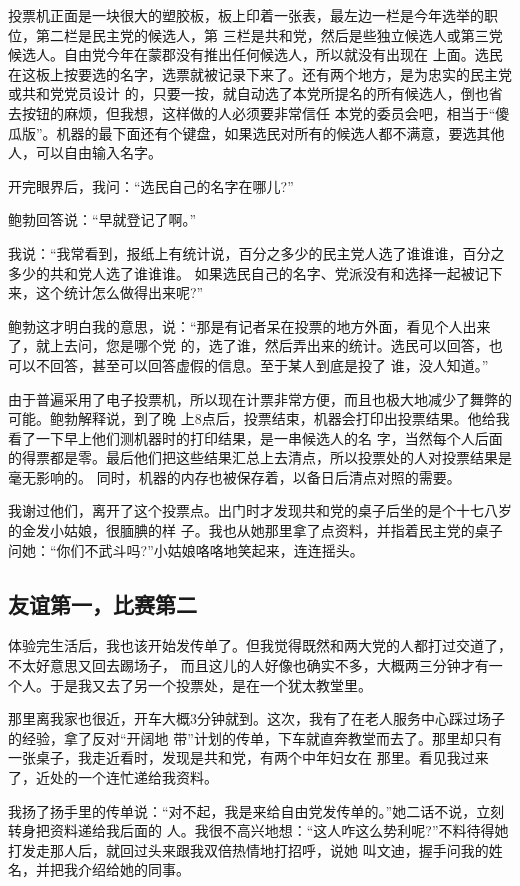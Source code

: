 ﻿\documentclass[11pt]{article}
\begin{document}
投票机正面是一块很大的塑胶板，板上印着一张表，最左边一栏是今年选举的职位，第二栏是民主党的候选人，第
三栏是共和党，然后是些独立候选人或第三党候选人。自由党今年在蒙郡没有推出任何候选人，所以就没有出现在
上面。选民在这板上按要选的名字，选票就被记录下来了。还有两个地方，是为忠实的民主党或共和党党员设计
的，只要一按，就自动选了本党所提名的所有候选人，倒也省去按钮的麻烦，但我想，这样做的人必须要非常信任
本党的委员会吧，相当于``傻瓜版''。机器的最下面还有个键盘，如果选民对所有的候选人都不满意，要选其他
人，可以自由输入名字。

开完眼界后，我问：``选民自己的名字在哪儿?''

鲍勃回答说：``早就登记了啊。''

我说：``我常看到，报纸上有统计说，百分之多少的民主党人选了谁谁谁，百分之多少的共和党人选了谁谁谁。
如果选民自己的名字、党派没有和选择一起被记下来，这个统计怎么做得出来呢?''

鲍勃这才明白我的意思，说：``那是有记者呆在投票的地方外面，看见个人出来了，就上去问，您是哪个党
的，选了谁，然后弄出来的统计。选民可以回答，也可以不回答，甚至可以回答虚假的信息。至于某人到底是投了
谁，没人知道。''

由于普遍采用了电子投票机，所以现在计票非常方便，而且也极大地减少了舞弊的可能。鲍勃解释说，到了晚
上8点后，投票结束，机器会打印出投票结果。他给我看了一下早上他们测机器时的打印结果，是一串候选人的名
字，当然每个人后面的得票都是零。最后他们把这些结果汇总上去清点，所以投票处的人对投票结果是毫无影响的。
同时，机器的内存也被保存着，以备日后清点对照的需要。

我谢过他们，离开了这个投票点。出门时才发现共和党的桌子后坐的是个十七八岁的金发小姑娘，很腼腆的样
子。我也从她那里拿了点资料，并指着民主党的桌子问她：``你们不武斗吗?''小姑娘咯咯地笑起来，连连摇头。

\subsection{友谊第一，比赛第二}

体验完生活后，我也该开始发传单了。但我觉得既然和两大党的人都打过交道了，不太好意思又回去踢场子，
而且这儿的人好像也确实不多，大概两三分钟才有一个人。于是我又去了另一个投票处，是在一个犹太教堂里。

那里离我家也很近，开车大概3分钟就到。这次，我有了在老人服务中心踩过场子的经验，拿了反对``开阔地
带''计划的传单，下车就直奔教堂而去了。那里却只有一张桌子，我走近看时，发现是共和党，有两个中年妇女在
那里。看见我过来了，近处的一个连忙递给我资料。

我扬了扬手里的传单说：``对不起，我是来给自由党发传单的。''她二话不说，立刻转身把资料递给我后面的
人。我很不高兴地想：``这人咋这么势利呢?''不料待得她打发走那人后，就回过头来跟我双倍热情地打招呼，说她
叫文迪，握手问我的姓名，并把我介绍给她的同事。
\end{document}
